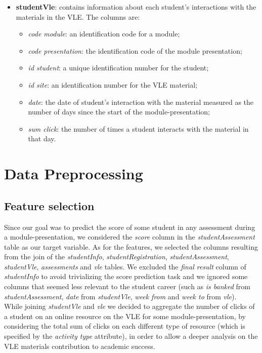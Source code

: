 \documentclass{article}
\begin{document}
\begin{itemize}
    \item \textbf{studentVle}: contains information about each student’s interactions with the materials in the VLE. The columns are:
    \begin{itemize}
        \item \textit{code module}: an identification code for a module;
        \item \textit{code presentation}: the identification code of the module presentation;
        \item \textit{id student}: a unique identification number for the student;
        \item \textit{id site}: an identification number for the VLE material;
        \item \textit{date}: the date of student’s interaction with the material measured as the number of days since the start of the module-presentation;
        \item \textit{sum click}: the number of times a student interacts with the material in that day.
    \end{itemize}

    \end{itemize}


\section{Data Preprocessing}

\subsection{Feature selection}

Since our goal was to predict the score of some student in any assessment during a module-presentation, we considered the \textit{score} column in the \textit{studentAssessment} table as our target variable. As for the features, we selected the columns resulting from the join of the \textit{studentInfo}, \textit{studentRegistration}, \textit{studentAssessment}, \textit{studentVle}, \textit{assessments} and \textit{vle} tables. We excluded the \textit{final result} column of \textit{studentInfo} to avoid trivializing the score prediction task and we ignored some columns that seemed less relevant to the student career (such as \textit{is banked} from \textit{studentAssessment}, \textit{date} from \textit{studentVle}, \textit{week from} and \textit{week to} from \textit{vle}).\\ 

While joining \textit{studentVle} and \textit{vle} we decided to aggregate the number of clicks of a student on an online resource on the VLE for some module-presentation, by considering the total sum of clicks on each different type of resource (which is specified by the \textit{activity type} attribute), in order to allow a deeper analysis on the VLE materials contribution to academic success.\\
\end{document}
